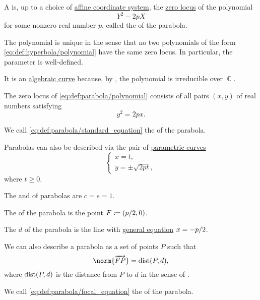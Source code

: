 \begin{definition}\label{def:parabola}
  A  is, up to a choice of \hyperref[def:affine_coordinate_system]{affine coordinate system}, the \hyperref[def:zero_locus]{zero locus} of the polynomial
  \begin{equation}\label{eq:def:parabola/polynomial}
    Y^2 - 2p X
  \end{equation}
  for some nonzero real number \( p \), called the  of the parabola.

  The polynomial is unique in the sense that no two polynomials of the form \eqref{eq:def:hyperbola/polynomial} have the same zero locus. In particular, the parameter is well-defined.

  It is an \hyperref[def:affine_algebraic_set/curve]{algebraic curve} because, by , the polynomial is irreducible over \( \BbbC \).

  \begin{thmenum}
     The zero locus of \eqref{eq:def:parabola/polynomial} consists of all pairs \( (x, y) \) of real numbers satisfying
    \begin{equation}\label{eq:def:parabola/standard_equation}
      y^2 = 2px.
    \end{equation}

    We call \eqref{eq:def:parabola/standard_equation} the  of the parabola.

     Parabolas can also be described via the pair of \hyperref[def:parametric_curve]{parametric curves}
    \begin{equation}\label{eq:def:parabola/parametric_equation}
      \begin{cases}
        x = t, \\
        y = \pm \sqrt{ 2pt },
      \end{cases}
    \end{equation}
    where \( t \geq 0 \).

     The  and  of parabolas are \( c = e = 1 \).

     The  of the parabola is the point \( F \coloneqq (\ifrac p 2, 0) \).

     The  \( d \) of the parabola is the line with \hyperref[def:plane_line_equations/general]{general equation} \( x = -\ifrac p 2 \).

     We can also describe a parabola as a set of points \( P \) such that
    \begin{equation}\label{eq:def:parabola/focal_equation}
      \norm{\vect{FP}} = \op{dist}(P, d),
    \end{equation}
    where \( \operatorname{dist}(P, d) \) is the distance from \( P \) to \( d \) in the sense of .

    We call \eqref{eq:def:parabola/focal_equation} the  of the parabola.
  \end{thmenum}
\end{definition}
